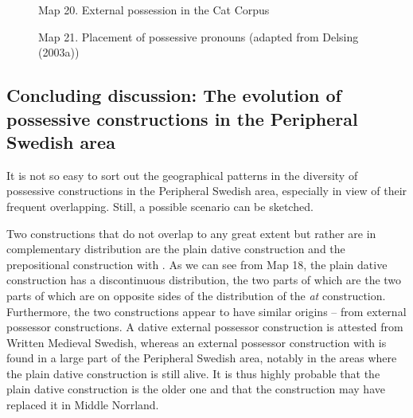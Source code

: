 \begin{figure}[h]
\centering
\begin{minipage}{5.4625in}
\label{bkm:Ref173230618}Map 20. External possession in the Cat Corpus
\end{minipage}
\end{figure}
\clearpage%



\begin{figure}[h]
\centering
\begin{minipage}{5.875in}
\label{bkm:Ref137359143}Map 21. Placement of possessive pronouns (adapted from Delsing (2003a))
\end{minipage}
\end{figure}
\clearpage\subsection[Concluding discussion: The evolution of possessive constructions in the Peripheral Swedish area]{\rmfamily Concluding discussion: The evolution of possessive constructions in the Peripheral Swedish area}
It is not so easy to sort out the geographical patterns in the diversity of possessive constructions in the Peripheral Swedish area, especially in view of their frequent overlapping. Still, a possible scenario can be sketched.

Two constructions that do not overlap to any great extent but rather are in complementary distribution are the plain dative construction and the prepositional construction with . As we can see from Map 18, the plain dative construction has a discontinuous distribution, the two parts of which are the two parts of which are on opposite sides of the distribution of the \textit{at} construction. Furthermore, the two constructions appear to have similar origins – from external possessor constructions. A dative external possessor construction is attested from Written Medieval Swedish, whereas an external possessor construction with  is found in a large part of the Peripheral Swedish area, notably in the areas where the plain dative construction is still alive. It is thus highly probable that the plain dative construction is the older one and that the  construction may have replaced it in Middle Norrland. 

